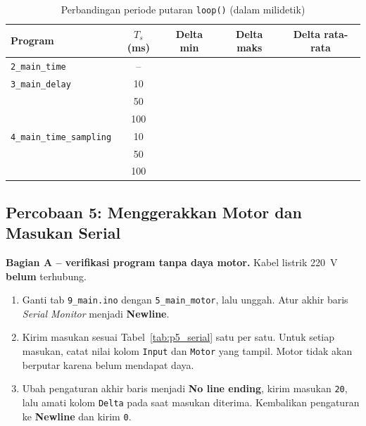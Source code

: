 \documentclass[11pt,a4paper]{article}
\newcommand{\prog}[1]{\texttt{#1}}
\begin{document}
\begin{table}[H]
	\centering
	\caption{Perbandingan periode putaran \texttt{loop()} (dalam milidetik)}
	\label{tab:p4_waktu}
	\begin{tabularx}{\textwidth}{|l|c|C|C|C|}
		\hline
		\textbf{Program}                    & \textbf{$T_s$ (ms)} & \textbf{Delta min} & \textbf{Delta maks} & \textbf{Delta rata-rata} \\
		\hline
		\prog{2\_main\_time}               & --                    &                    &                     &                          \\
		\hline
		\prog{3\_main\_delay} & 10                &                    &                     &                          \\
		                                   & 50                    &                    &                     &                          \\
		                                   & 100                   &                    &                     &                          \\
		\hline
		\prog{4\_main\_time\_sampling}     & 10                    &                    &                     &                          \\
		                                   & 50                    &                    &                     &                          \\
		                                   & 100                   &                    &                     &                          \\
		\hline
	\end{tabularx}
\end{table}

\subsection{Percobaan 5: Menggerakkan Motor dan Masukan Serial}
\textbf{Bagian A -- verifikasi program tanpa daya motor.} Kabel listrik 220~V \textbf{belum} terhubung.
\begin{enumerate}
	\item Ganti tab \prog{9\_main.ino} dengan \prog{5\_main\_motor}, lalu unggah. Atur akhir baris \textit{Serial Monitor} menjadi \textbf{Newline}.
	\item Kirim masukan sesuai Tabel~\ref{tab:p5_serial} satu per satu. Untuk setiap masukan, catat nilai kolom \texttt{Input} dan \texttt{Motor} yang tampil. Motor tidak akan berputar karena belum mendapat daya.
	\item Ubah pengaturan akhir baris menjadi \textbf{No line ending}, kirim masukan \texttt{20}, lalu amati kolom \texttt{Delta} pada saat masukan diterima. Kembalikan pengaturan ke \textbf{Newline} dan kirim \texttt{0}.
\end{enumerate}
\end{document}
